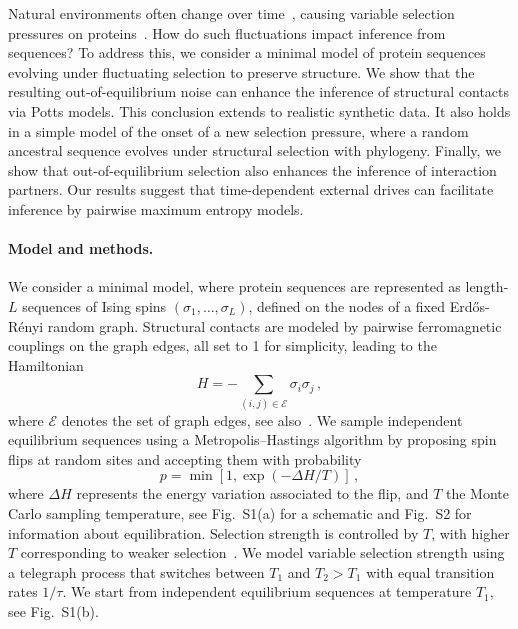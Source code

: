\documentclass[
 reprint,








nobibnotes,

 amsmath,amssymb,
 aps,
 prl,
 longbibliography






]{revtex4-2}
\begin{document}
Natural environments often change over time~\cite{Mustonen2008,Bell2010,Melbinger15,Wienand17,Taitelbaum20,Meyer20}, causing variable selection pressures on proteins~\cite{Mustonen2008}.
How do such fluctuations impact inference from sequences?
To address this, we consider a minimal model of protein sequences evolving under fluctuating selection to preserve structure.
We show that the resulting out-of-equilibrium noise can enhance the inference of structural contacts via Potts models. This conclusion extends to realistic synthetic data. It also holds in a simple model of the onset of a new selection pressure, where a random ancestral sequence evolves under structural selection with phylogeny. Finally, we show that out-of-equilibrium selection also enhances the inference of interaction partners. Our results suggest that time-dependent external drives can facilitate inference by pairwise maximum entropy models.

\paragraph*{Model and methods.}
We consider a minimal model, where protein sequences are represented as length-$L$ sequences of  Ising spins $(\sigma_1,\dots,\sigma_L)$, defined on the nodes of a fixed Erd\H{o}s-Rényi random graph. Structural contacts are modeled by pairwise ferromagnetic couplings on the graph edges, all set to 1 for simplicity, leading to the Hamiltonian
\begin{equation}
H=-\sum_{(i,j)\in\mathcal{E}}\sigma_i\sigma_j\,,
\label{ham}
\end{equation}
where $\mathcal{E}$ denotes the set of graph edges, see also~\cite{Dietler2023}.
We sample independent equilibrium sequences using a Metropolis–Hastings algorithm by proposing spin flips at random sites and accepting them with probability
\begin{equation}
p=\min\left[1,\exp(-\Delta H/T)\right]\,,
\label{proba}
\end{equation}
where $\Delta H$ represents the energy variation associated to the flip, and $T$ the Monte Carlo sampling temperature, see Fig.~S1(a) for a schematic and Fig.~S2 for information about equilibration.
Selection strength is controlled by $T$, with higher $T$ corresponding to weaker selection~\cite{Dietler2023}.
We model variable selection strength using a telegraph process that switches between $T_1$ and $T_2>T_{1}$ with equal transition rates $1/\tau$. We start from independent equilibrium sequences at temperature $T_{1}$, see Fig.~S1(b).
\end{document}
